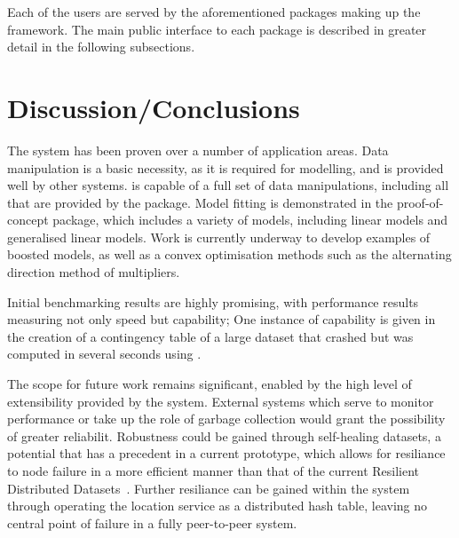 \documentclass[letterpaper, inpress]{jds} %
\begin{document}
Each of the users are served by the aforementioned packages making up the framework.
The main public interface to each package is described in greater detail in the following subsections. 

\subsection{}
\subsection{}
\subsection{}
\subsection{}

\section{Discussion/Conclusions}

The  system has been proven over a number of application areas.
Data manipulation is a basic necessity, as it is required for modelling, and is provided well by other systems.
 is capable of a full set of data manipulations, including all that are provided by the  package.
Model fitting is demonstrated in the proof-of-concept  package, which includes a variety of models, including linear models and generalised linear models.
Work is currently underway to develop examples of boosted models, as well as a convex optimisation methods such as the alternating direction method of multipliers.

Initial benchmarking results are highly promising, with performance results measuring not only speed but capability;
One instance of capability is given in the creation of a contingency table of a large dataset that crashed  but was computed in several seconds using .

The scope for future work remains significant, enabled by the high level of extensibility provided by the system.
External systems which serve to monitor performance or take up the role of garbage collection would grant the possibility of greater reliabilit.
Robustness could be gained through self-healing datasets, a potential that has a precedent in a current prototype, which allows for resiliance to node failure in a more efficient manner than that of the current Resilient Distributed Datasets~\citep{zaharia2012resilient}.
Further resiliance can be gained within the system through operating the location service as a distributed hash table, leaving no central point of failure in a fully peer-to-peer system.



\end{document}
